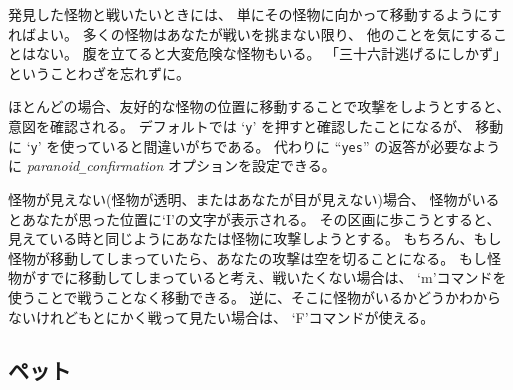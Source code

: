 発見した怪物と戦いたいときには、
単にその怪物に向かって移動するようにすればよい。
多くの怪物はあなたが戦いを挑まない限り、
他のことを気にすることはない。
腹を立てると大変危険な怪物もいる。
「三十六計逃げるにしかず」ということわざを忘れずに。

ほとんどの場合、友好的な怪物の位置に移動することで攻撃をしようとすると、
意図を確認される。
デフォルトでは `{\tt y}' を押すと確認したことになるが、
移動に `{\tt y}' を使っていると間違いがちである。
代わりに ``{\tt yes}'' の返答が必要なように
{\it paranoid\verb+_+confirmation\/}
オプションを設定できる。

怪物が見えない(怪物が透明、またはあなたが目が見えない)場合、
怪物がいるとあなたが思った位置に`I'の文字が表示される。
その区画に歩こうとすると、見えている時と同じようにあなたは怪物に攻撃しようとする。
もちろん、もし怪物が移動してしまっていたら、あなたの攻撃は空を切ることになる。
もし怪物がすでに移動してしまっていると考え、戦いたくない場合は、
`m'コマンドを使うことで戦うことなく移動できる。
逆に、そこに怪物がいるかどうかわからないけれどもとにかく戦って見たい場合は、
`F'コマンドが使える。

\subsection*{ペット}


